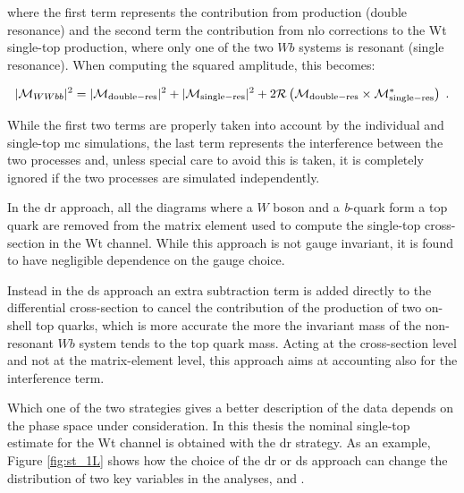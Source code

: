 \noindent where the first term represents the contribution from \ttbar production (double resonance) and the second term the contribution from 
\gls{nlo} corrections to the Wt single-top production, where only one of the two $Wb$ systems is resonant (single resonance). 
When computing the squared amplitude, this becomes:

\begin{equation}
|\mathcal{M}_{WWbb}|^2 = |\mathcal{M}_{\rm{double-res}}|^2 + |\mathcal{M}_{\rm{single-res}}|^2 + 2 \mathcal{R}\left(\mathcal{M}_{\rm{double-res}}\times \mathcal{M}_{\rm{single-res}}^* \right) \; . \nonumber
\end{equation}

While the first two terms are properly taken into account by the individual \ttbar and single-top \gls{mc} simulations, 
the last term represents the interference between the two processes and, unless special care to avoid this is taken, it is completely ignored if the two processes are simulated independently. 

In the \gls{dr} approach, all the diagrams where a $W$ boson and a \textit{b}-quark form a top quark are removed from the matrix element used to compute the   single-top cross-section in the Wt channel. While this approach is not gauge invariant, it is found to have negligible dependence on the gauge choice.

Instead in the \gls{ds} approach an extra subtraction term is added directly to the differential cross-section to cancel the contribution of the 
production of two on-shell top quarks, which is more accurate the more the invariant mass of the non-resonant $Wb$ system tends to the top quark mass. 
Acting at the cross-section level and not at the matrix-element level, this approach aims at accounting also for the interference term. 

Which one of the two strategies gives a better description of the data depends on the phase space under consideration. 
In this thesis the nominal single-top estimate for the Wt channel is obtained with the \gls{dr} strategy. 
As an example, Figure \ref{fig:st_1L} shows how the choice of the \gls{dr} or \gls{ds} approach can change the distribution of two key variables 
in the analyses, \met and \mtb. 

